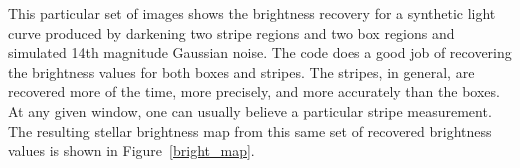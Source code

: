 This particular set of images shows the brightness recovery for a synthetic light curve produced by darkening two stripe regions and two box regions and simulated 14th magnitude Gaussian noise. The code does a good job of recovering the brightness values for both boxes and stripes. The stripes, in general, are recovered more of the time, more precisely, and more accurately than the boxes. At any given window, one can usually believe a particular stripe measurement. The resulting stellar brightness map from this same set of recovered brightness values is shown in Figure~\ref{bright_map}.


